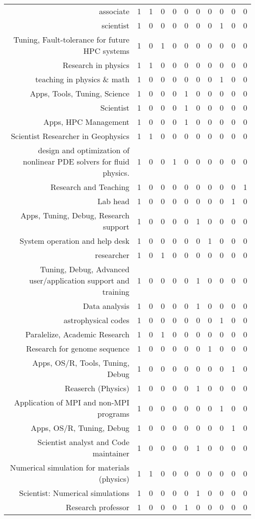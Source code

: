 {\begin{landscape}
\begin{longtable}[htb]{r|c|c|c|c|c|c|c|c|c|c}
{associate} & 1 & 1 & 0 & 0 & 0 & 0 & 0 & 0 & 0 & 0 \\%
{scientist} & 1 & 0 & 0 & 0 & 0 & 0 & 0 & 1 & 0 & 0 \\%
{Tuning, Fault-tolerance for future HPC systems} & 1 & 0 & 1 & 0 & 0 & 0 & 0 & 0 & 0 & 0 \\%
{Research in physics} & 1 & 1 & 0 & 0 & 0 & 0 & 0 & 0 & 0 & 0 \\%
{teaching in physics \& math} & 1 & 0 & 0 & 0 & 0 & 0 & 0 & 1 & 0 & 0 \\%
{Apps, Tools, Tuning, Science} & 1 & 0 & 0 & 0 & 1 & 0 & 0 & 0 & 0 & 0 \\%
{Scientist} & 1 & 0 & 0 & 0 & 1 & 0 & 0 & 0 & 0 & 0 \\%
{Apps, HPC Management} & 1 & 0 & 0 & 0 & 1 & 0 & 0 & 0 & 0 & 0 \\%
{Scientist Researcher in Geophysics} & 1 & 1 & 0 & 0 & 0 & 0 & 0 & 0 & 0 & 0 \\%
{design and optimization of nonlinear PDE solvers for fluid physics.} & 1 & 0 & 0 & 1 & 0 & 0 & 0 & 0 & 0 & 0 \\%
{Research and Teaching} & 1 & 0 & 0 & 0 & 0 & 0 & 0 & 0 & 0 & 1 \\%
{Lab head} & 1 & 0 & 0 & 0 & 0 & 0 & 0 & 0 & 1 & 0 \\%
{Apps, Tuning, Debug, Research support} & 1 & 0 & 0 & 0 & 0 & 1 & 0 & 0 & 0 & 0 \\%
{System operation and help desk} & 1 & 0 & 0 & 0 & 0 & 0 & 1 & 0 & 0 & 0 \\%
{researcher} & 1 & 0 & 1 & 0 & 0 & 0 & 0 & 0 & 0 & 0 \\%
{Tuning, Debug, Advanced user/application support and training} & 1 & 0 & 0 & 0 & 0 & 1 & 0 & 0 & 0 & 0 \\%
{Data analysis} & 1 & 0 & 0 & 0 & 0 & 1 & 0 & 0 & 0 & 0 \\%
{astrophysical codes} & 1 & 0 & 0 & 0 & 0 & 0 & 0 & 1 & 0 & 0 \\%
{Paralelize, Academic Research} & 1 & 0 & 1 & 0 & 0 & 0 & 0 & 0 & 0 & 0 \\%
{Research for genome sequence} & 1 & 0 & 0 & 0 & 0 & 0 & 1 & 0 & 0 & 0 \\%
{Apps, OS/R, Tools, Tuning, Debug} & 1 & 0 & 0 & 0 & 0 & 0 & 0 & 0 & 1 & 0 \\%
{Reaserch (Physics)} & 1 & 0 & 0 & 0 & 0 & 1 & 0 & 0 & 0 & 0 \\%
{Application of MPI and non-MPI programs} & 1 & 0 & 0 & 0 & 0 & 0 & 0 & 1 & 0 & 0 \\%
{Apps, OS/R, Tuning, Debug} & 1 & 0 & 0 & 0 & 0 & 0 & 0 & 0 & 1 & 0 \\%
{Scientist analyst and Code maintainer} & 1 & 0 & 0 & 0 & 0 & 1 & 0 & 0 & 0 & 0 \\%
{Numerical simulation for materials (physics)} & 1 & 1 & 0 & 0 & 0 & 0 & 0 & 0 & 0 & 0 \\%
{Scientist: Numerical simulations} & 1 & 0 & 0 & 0 & 0 & 1 & 0 & 0 & 0 & 0 \\%
{Research professor} & 1 & 0 & 0 & 0 & 1 & 0 & 0 & 0 & 0 & 0 \\%
\hline%
\end{longtable}%
\end{landscape}}%
\clearpage%
